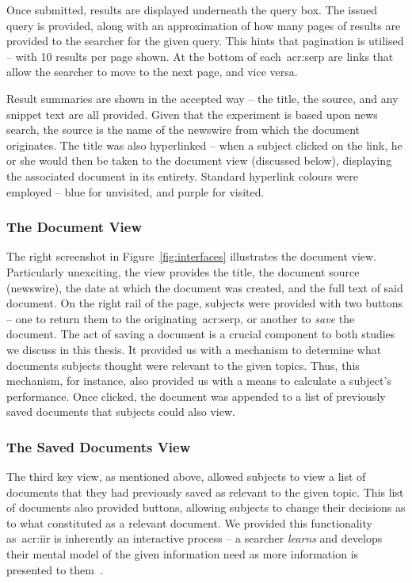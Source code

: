 Once submitted, results are displayed underneath the query box. The issued query is provided, along with an approximation of how many pages of results are provided to the searcher for the given query. This hints that pagination is utilised -- with 10 results per page shown. At the bottom of each~\gls{acr:serp} are links that allow the searcher to move to the next page, and vice versa.

Result summaries are shown in the accepted way -- the title, the source, and any snippet text are all provided. Given that the experiment is based upon news search, the source is the name of the newswire from which the document originates. The title was also hyperlinked -- when a subject clicked on the link, he or she would then be taken to the document view (discussed below), displaying the associated document in its entirety. Standard hyperlink colours were employed -- blue for unvisited, and purple for visited.

\subsubsection{The Document View}
The right screenshot in Figure~\ref{fig:interfaces} illustrates the document view. Particularly unexciting, the view provides the title, the document source (newswire), the date at which the document was created, and the full text of said document. On the right rail of the page, subjects were provided with two buttons -- one to return them to the originating~\gls{acr:serp}, or another to \emph{save} the document. The act of saving a document is a crucial component to both studies we discuss in this thesis. It provided us with a mechanism to determine what documents subjects thought were relevant to the given topics. Thus, this mechanism, for instance, also provided us with a means to calculate a subject's performance. Once clicked, the document was appended to a list of previously saved documents that subjects could also view.

\subsubsection{The Saved Documents View}
The third key view, as mentioned above, allowed subjects to view a list of documents that they had previously saved as relevant to the given topic. This list of documents also provided buttons, allowing subjects to change their decisions as to what constituted as a relevant document. We provided this functionality as~\gls{acr:iir} is inherently an interactive process -- a searcher \emph{learns} and develops their mental model of the given information need as more information is presented to them~\citep{ingwersen2005theturn}.

